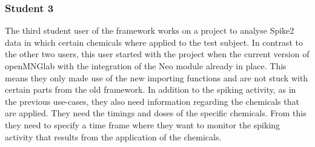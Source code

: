 \subsubsection{Student 3}

The third student user of the framework works on a project to analyse Spike2 data in which certain chemicals where applied to the test subject. In contrast to the other two users, this user started with the project when the current version of openMNGlab with the integration of the Neo module already in place. This means they only made use of the new importing functions and are not stuck with certain parts from the old framework. In addition to the spiking activity, as in the previous use-cases, they also need information regarding the chemicals that are applied. They need the timings and doses of the specific chemicals. From this they need to specify a time frame where they want to monitor the spiking activity that results from the application of the chemicals.\\

